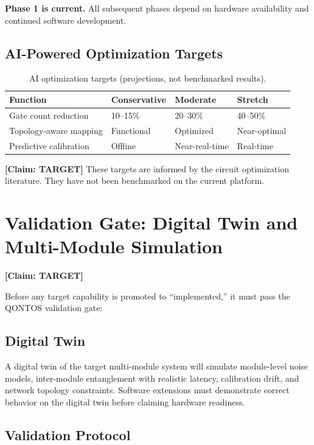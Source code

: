 \documentclass[conference]{IEEEtran}
\begin{document}
\textbf{Phase 1 is current.} All subsequent phases depend on hardware availability and continued software development.

\subsection{AI-Powered Optimization Targets}

\begin{table}[H]
\centering
\caption{AI optimization targets (projections, not benchmarked results).}
\label{tab:ai-opt}
\footnotesize
\begin{tabularx}{\columnwidth}{L{2.5cm}L{1.5cm}L{1.5cm}L{1.5cm}}
\toprule
\textbf{Function} & \textbf{Conservative} & \textbf{Moderate} & \textbf{Stretch} \\
\midrule
Gate count reduction & 10--15\% & 20--30\% & 40--50\% \\
Topology-aware mapping & Functional & Optimized & Near-optimal \\
Predictive calibration & Offline & Near-real-time & Real-time \\
\bottomrule
\end{tabularx}
\end{table}

\textbf{[Claim: TARGET]} These targets are informed by the circuit optimization literature. They have not been benchmarked on the current platform.

\section{Validation Gate: Digital Twin and Multi-Module Simulation}

\textbf{[Claim: TARGET]}

Before any target capability is promoted to ``implemented,'' it must pass the QONTOS validation gate:

\subsection{Digital Twin}

A digital twin of the target multi-module system will simulate module-level noise models, inter-module entanglement with realistic latency, calibration drift, and network topology constraints. Software extensions must demonstrate correct behavior on the digital twin before claiming hardware readiness.

\subsection{Validation Protocol}
\end{document}
